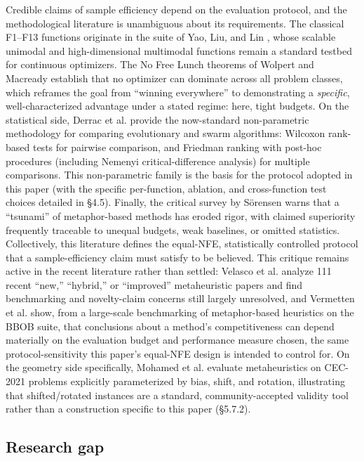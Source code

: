 \documentclass[preprint,12pt]{elsarticle}
\begin{document}
Credible claims of sample efficiency depend on the evaluation protocol, and the methodological literature is unambiguous about its requirements. The classical F1--F13 functions originate in the suite of Yao, Liu, and Lin \cite{yao1999evolutionary}, whose scalable unimodal and high-dimensional multimodal functions remain a standard testbed for continuous optimizers. The No Free Lunch theorems of Wolpert and Macready \cite{wolpert1997no} establish that no optimizer can dominate across all problem classes, which reframes the goal from ``winning everywhere'' to demonstrating a \emph{specific}, well-characterized advantage under a stated regime: here, tight budgets. On the statistical side, Derrac et al. \cite{derrac2011practical} provide the now-standard non-parametric methodology for comparing evolutionary and swarm algorithms: Wilcoxon rank-based tests for pairwise comparison, and Friedman ranking with post-hoc procedures (including Nemenyi critical-difference analysis) for multiple comparisons. This non-parametric family is the basis for the protocol adopted in this paper (with the specific per-function, ablation, and cross-function test choices detailed in \S4.5). Finally, the critical survey by S\"orensen \cite{sorensen2015metaheuristics} warns that a ``tsunami'' of metaphor-based methods has eroded rigor, with claimed superiority frequently traceable to unequal budgets, weak baselines, or omitted statistics. Collectively, this literature defines the equal-NFE, statistically controlled protocol that a sample-efficiency claim must satisfy to be believed. This critique remains active in the recent literature rather than settled: Velasco et al. \cite{velasco2024literature} analyze 111 recent ``new,'' ``hybrid,'' or ``improved'' metaheuristic papers and find benchmarking and novelty-claim concerns still largely unresolved, and Vermetten et al. \cite{vermetten2024largescale} show, from a large-scale benchmarking of metaphor-based heuristics on the BBOB suite, that conclusions about a method's competitiveness can depend materially on the evaluation budget and performance measure chosen, the same protocol-sensitivity this paper's equal-NFE design is intended to control for. On the geometry side specifically, Mohamed et al. \cite{mohamed2023evaluating} evaluate metaheuristics on CEC-2021 problems explicitly parameterized by bias, shift, and rotation, illustrating that shifted/rotated instances are a standard, community-accepted validity tool rather than a construction specific to this paper (\S5.7.2).

\subsection{Research gap}
\label{subsec2-6}
\end{document}

